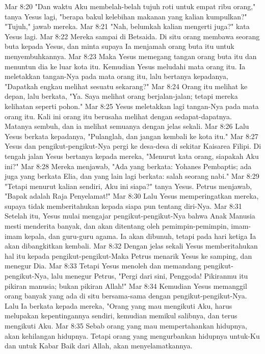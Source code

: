 Mar 8:20  "Dan waktu Aku membelah-belah tujuh roti untuk empat ribu orang," tanya Yesus lagi, "berapa bakul kelebihan makanan yang kalian kumpulkan?" "Tujuh," jawab mereka.
Mar 8:21  "Nah, belumkah kalian mengerti juga?" kata Yesus lagi.
Mar 8:22  Mereka sampai di Betsaida. Di situ orang membawa seorang buta kepada Yesus, dan minta supaya Ia menjamah orang buta itu untuk menyembuhkannya.
Mar 8:23  Maka Yesus memegang tangan orang buta itu dan menuntun dia ke luar kota itu. Kemudian Yesus meludahi mata orang itu. Ia meletakkan tangan-Nya pada mata orang itu, lalu bertanya kepadanya, "Dapatkah engkau melihat sesuatu sekarang?"
Mar 8:24  Orang itu melihat ke depan, lalu berkata, "Ya. Saya melihat orang berjalan-jalan; tetapi mereka kelihatan seperti pohon."
Mar 8:25  Yesus meletakkan lagi tangan-Nya pada mata orang itu. Kali ini orang itu berusaha melihat dengan sedapat-dapatnya. Matanya sembuh, dan ia melihat semuanya dengan jelas sekali.
Mar 8:26  Lalu Yesus berkata kepadanya, "Pulanglah, dan jangan kembali ke kota itu."
Mar 8:27  Yesus dan pengikut-pengikut-Nya pergi ke desa-desa di sekitar Kaisarea Filipi. Di tengah jalan Yesus bertanya kepada mereka, "Menurut kata orang, siapakah Aku ini?"
Mar 8:28  Mereka menjawab, "Ada yang berkata: Yohanes Pembaptis; ada juga yang berkata Elia, dan yang lain lagi berkata: salah seorang nabi."
Mar 8:29  "Tetapi menurut kalian sendiri, Aku ini siapa?" tanya Yesus. Petrus menjawab, "Bapak adalah Raja Penyelamat!"
Mar 8:30  Lalu Yesus memperingatkan mereka, supaya tidak memberitahukan kepada siapa pun tentang diri-Nya.
Mar 8:31  Setelah itu, Yesus mulai mengajar pengikut-pengikut-Nya bahwa Anak Manusia mesti menderita banyak, dan akan ditentang oleh pemimpin-pemimpin, imam-imam kepala, dan guru-guru agama. Ia akan dibunuh, tetapi pada hari ketiga Ia akan dibangkitkan kembali.
Mar 8:32  Dengan jelas sekali Yesus memberitahukan hal itu kepada pengikut-pengikut-Maka Petrus menarik Yesus ke samping, dan menegur Dia.
Mar 8:33  Tetapi Yesus menoleh dan memandang pengikut-pengikut-Nya, lalu menegur Petrus, "Pergi dari sini, Penggoda! Pikiranmu itu pikiran manusia; bukan pikiran Allah!"
Mar 8:34  Kemudian Yesus memanggil orang banyak yang ada di situ bersama-sama dengan pengikut-pengikut-Nya. Lalu Ia berkata kepada mereka, "Orang yang mau mengikuti Aku, harus melupakan kepentingannya sendiri, kemudian memikul salibnya, dan terus mengikuti Aku.
Mar 8:35  Sebab orang yang mau mempertahankan hidupnya, akan kehilangan hidupnya. Tetapi orang yang mengurbankan hidupnya untuk-Ku dan untuk Kabar Baik dari Allah, akan menyelamatkannya.
